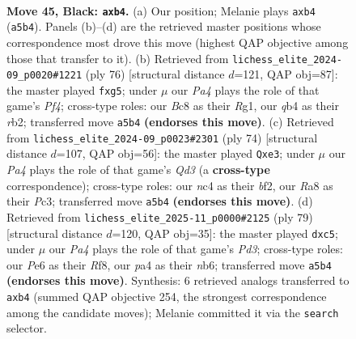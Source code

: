 \documentclass[11pt]{article}
\begin{document}
\clearpage

\begin{figure}[p]\centering
\begin{subfigure}{0.46\textwidth}\centering
\resizebox{\linewidth}{!}{%
\newchessgame
\chessboard[
  setfen={rnb5/1p4k1/4p3/p2n1pNp/PQN2P2/1P4P1/4B1KP/7R b - - 0 45},
  showmover=false,
  pgfstyle=straightmove, color=movearrow, markmove={a5-b4}
]}
\caption{}
\end{subfigure}\hfill
\begin{subfigure}{0.46\textwidth}\centering
\resizebox{\linewidth}{!}{%
\newchessgame
\chessboard[
  setfen={4r1k1/5p1p/3Bp1pP/3bP1q1/p4P2/2R5/1r4PK/6R1 w - - 0 39},
  showmover=false,
  pgfstyle=straightmove, color=movearrow, markmove={f4-g5}
]}
\caption{}
\end{subfigure}
\\[4pt]
\begin{subfigure}{0.46\textwidth}\centering
\resizebox{\linewidth}{!}{%
\newchessgame
\chessboard[
  setfen={8/pp3pk1/2n3pp/P3p3/1P2P2N/2PQq1PK/5b2/8 w - - 3 38},
  showmover=false,
  pgfstyle=straightmove, color=movearrow, markmove={d3-e3}
]}
\caption{}
\end{subfigure}\hfill
\begin{subfigure}{0.46\textwidth}\centering
\resizebox{\linewidth}{!}{%
\newchessgame
\chessboard[
  setfen={3r1r2/1p5k/1N1p3p/2Q3p1/2P1Pp2/P4P1P/1PKR2P1/8 b - - 0 40},
  showmover=false,
  pgfstyle=straightmove, color=movearrow, markmove={d6-c5}
]}
\caption{}
\end{subfigure}
\caption{\textbf{Move 45, Black: \texttt{axb4}.} (a) Our position; Melanie plays \texttt{axb4} (\texttt{a5b4}). Panels (b)--(d) are the retrieved master positions whose correspondence most drove this move (highest QAP objective among those that transfer to it). (b) Retrieved from \texttt{lichess\_elite\_2024-09\_p0020\#1221} (ply 76) [structural distance $d$=121, QAP obj=87]: the master played \texttt{fxg5}; under $\mu$ our \emph{Pa4} plays the role of that game's \emph{Pf4}; cross-type roles: our \emph{B}c8 as their \emph{R}g1, our \emph{q}b4 as their \emph{r}b2; transferred move \texttt{a5b4} \textbf{(endorses this move)}. (c) Retrieved from \texttt{lichess\_elite\_2024-09\_p0023\#2301} (ply 74) [structural distance $d$=107, QAP obj=56]: the master played \texttt{Qxe3}; under $\mu$ our \emph{Pa4} plays the role of that game's \emph{Qd3} (a \textbf{cross-type} correspondence); cross-type roles: our \emph{n}c4 as their \emph{b}f2, our \emph{R}a8 as their \emph{P}c3; transferred move \texttt{a5b4} \textbf{(endorses this move)}. (d) Retrieved from \texttt{lichess\_elite\_2025-11\_p0000\#2125} (ply 79) [structural distance $d$=120, QAP obj=35]: the master played \texttt{dxc5}; under $\mu$ our \emph{Pa4} plays the role of that game's \emph{Pd3}; cross-type roles: our \emph{P}e6 as their \emph{R}f8, our \emph{p}a4 as their \emph{n}b6; transferred move \texttt{a5b4} \textbf{(endorses this move)}. Synthesis: 6 retrieved analogs transferred to \texttt{axb4} (summed QAP objective 254, the strongest correspondence among the candidate moves); Melanie committed it via the \texttt{search} selector.}
\label{fig:thought-m89}
\end{figure}
\end{document}
